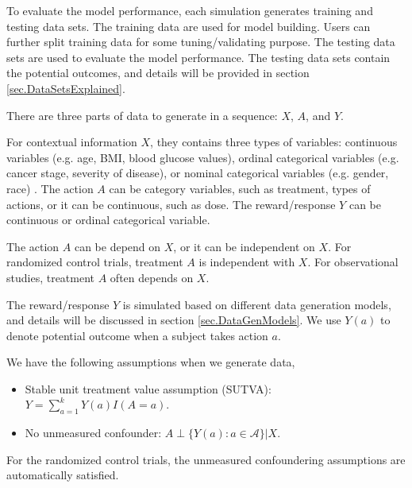 \documentclass[12pt]{article}
\def\cal{\mathcal}
\begin{document}
To evaluate the model performance, each simulation generates training and testing data sets. The training data are used for model building. Users can further split training data for some tuning/validating purpose. The testing data sets are used to evaluate the model performance. The testing data sets contain the potential outcomes, and details will be provided in section \ref{sec.DataSetsExplained}.

There are three parts of data to generate in a sequence: $X$, $A$, and $Y$.  

For contextual information $X$, they contains three types of variables: continuous variables (e.g. age, BMI, blood glucose values), ordinal categorical variables (e.g. cancer stage, severity of disease), or nominal categorical variables (e.g. gender, race) . The action $A$ can be category variables, such as treatment, types of actions, or it can be continuous, such as dose. The reward/response $Y$ can be continuous or ordinal categorical variable.

The action $A$ can be depend on $X$, or it can be independent on $X$. For randomized control trials, treatment $A$ is independent with $X$. For observational studies, treatment $A$ often depends on $X$.

The reward/response $Y$ is simulated based on different data generation models, and details will be discussed in section \ref{sec.DataGenModels}. We use $Y(a)$ to denote potential outcome when a subject takes action $a$. 

We have the following assumptions when we generate data,
\begin{itemize}
	\item Stable unit treatment value assumption (SUTVA): $Y=\sum_{a=1}^k Y(a)I(A=a)$.
	\item No unmeasured confounder: $A \perp \{Y(a): a \in {\cal A} \} | X $.
\end{itemize}
For the randomized control trials, the unmeasured confoundering assumptions are automatically satisfied. 
\end{document}
